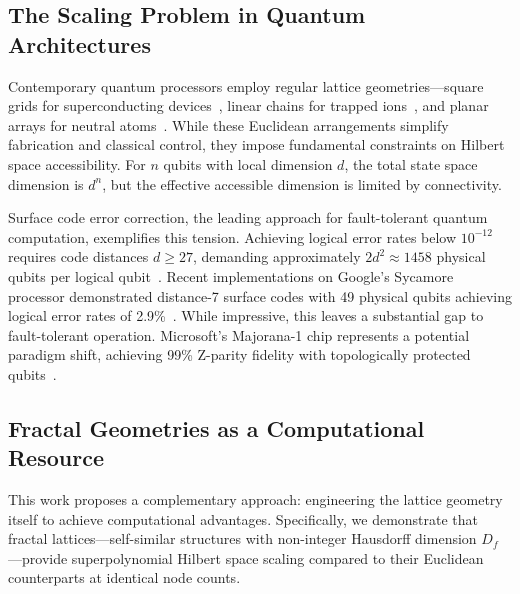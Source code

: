 \documentclass[aps,prx,twocolumn,groupedaddress,longbibliography]{revtex4-2}
\newcommand{\Df}{D_f}
\theoremstyle{plain}
\theoremstyle{definition}
\begin{document}
\subsection{The Scaling Problem in Quantum Architectures}

Contemporary quantum processors employ regular lattice geometries---square grids for superconducting devices~\cite{Arute2019}, linear chains for trapped ions~\cite{Monroe2013}, and planar arrays for neutral atoms~\cite{Saffman2010}. While these Euclidean arrangements simplify fabrication and classical control, they impose fundamental constraints on Hilbert space accessibility. For $n$ qubits with local dimension $d$, the total state space dimension is $d^n$, but the effective accessible dimension is limited by connectivity.

Surface code error correction, the leading approach for fault-tolerant quantum computation, exemplifies this tension. Achieving logical error rates below $10^{-12}$ requires code distances $d \geq 27$, demanding approximately $2d^2 \approx 1458$ physical qubits per logical qubit~\cite{Fowler2012}. Recent implementations on Google's Sycamore processor demonstrated distance-7 surface codes with 49 physical qubits achieving logical error rates of 2.9\%~\cite{Arute2019}. While impressive, this leaves a substantial gap to fault-tolerant operation. Microsoft's Majorana-1 chip represents a potential paradigm shift, achieving 99\% Z-parity fidelity with topologically protected qubits~\cite{Flensberg2021}.

\subsection{Fractal Geometries as a Computational Resource}

This work proposes a complementary approach: engineering the lattice geometry itself to achieve computational advantages. Specifically, we demonstrate that fractal lattices---self-similar structures with non-integer Hausdorff dimension $\Df$---provide superpolynomial Hilbert space scaling compared to their Euclidean counterparts at identical node counts.
\end{document}

